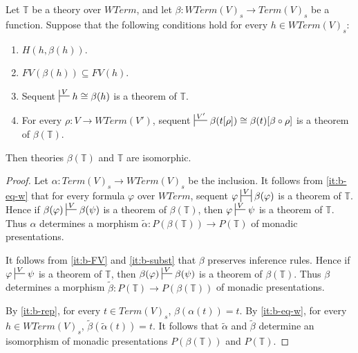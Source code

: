 \documentclass[reqno]{amsart}
\theoremstyle{definition}
\theoremstyle{remark}
\numberwithin{figure}{section}
\begin{document}
\begin{lem}[w-standard]
Let $\mathbb{T}$ be a theory over $WTerm$, and let $\beta : WTerm(V)_s \to Term(V)_s$ be a function.
Suppose that the following conditions hold for every $h \in WTerm(V)_s$:
\begin{enumerate}
\item \label{it:b-rep} $H(h,\beta(h))$.
\item \label{it:b-FV} $FV(\beta(h)) \subseteq FV(h)$.
\item \label{it:b-eq-w} Sequent $\sststile{}{V} h \cong \beta(h)$ is a theorem of $\mathbb{T}$.
\item \label{it:b-subst} For every $\rho : V \to WTerm(V')$, sequent $\sststile{}{V'} \beta(t[\rho]) \cong \beta(t)[\beta \circ \rho]$ is a theorem of $\beta(\mathbb{T})$.
\end{enumerate}
Then theories $\beta(\mathbb{T})$ and $\mathbb{T}$ are isomorphic.
\end{lem}
\begin{proof}
Let $\alpha : Term(V)_s \to WTerm(V)_s$ be the inclusion.
It follows from \eqref{it:b-eq-w} that for every formula $\varphi$ over $WTerm$, sequent $\varphi \ssststile{}{V} \beta(\varphi)$ is a theorem of $\mathbb{T}$.
Hence if $\beta(\varphi) \sststile{}{V} \beta(\psi)$ is a theorem of $\beta(\mathbb{T})$, then $\varphi \sststile{}{V} \psi$ is a theorem of $\mathbb{T}$.
Thus $\alpha$ determines a morphism $\widetilde{\alpha} : P(\beta(\mathbb{T})) \to P(\mathbb{T})$ of monadic presentations.

It follows from \eqref{it:b-FV} and \eqref{it:b-subst} that $\beta$ preserves inference rules.
Hence if $\varphi \sststile{}{V} \psi$ is a theorem of $\mathbb{T}$, then $\beta(\varphi) \sststile{}{V} \beta(\psi)$ is a theorem of $\beta(\mathbb{T})$.
Thus $\beta$ determines a morphism $\widetilde{\beta} : P(\mathbb{T}) \to P(\beta(\mathbb{T}))$ of monadic presentations.

By \eqref{it:b-rep}, for every $t \in Term(V)_s$, $\beta(\alpha(t)) = t$.
By \eqref{it:b-eq-w}, for every $h \in WTerm(V)_s$, $\widetilde{\beta}(\widetilde{\alpha}(t)) = t$.
It follows that $\widetilde{\alpha}$ and $\widetilde{\beta}$ determine an isomorphism of monadic presentations $P(\beta(\mathbb{T}))$ and $P(\mathbb{T})$.
\end{proof}
\end{document}
